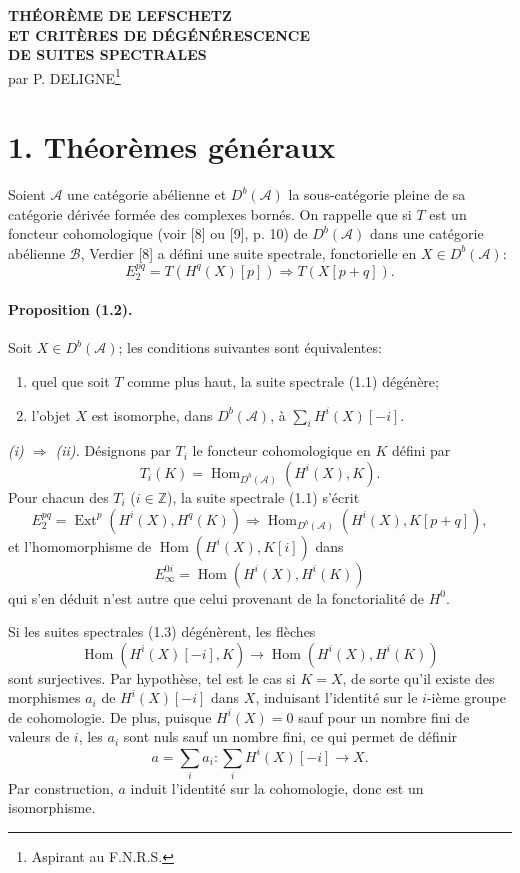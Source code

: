 \documentclass[10pt]{article}
\newcommand{\Acal}{\mathcal A}
\newcommand{\Bcal}{\mathcal B}
\newcommand{\Z}{\mathbb Z}
\newcommand{\Db}{D^b}
\newcommand{\Hom}{\operatorname{Hom}}
\newcommand{\Ext}{\operatorname{Ext}}
\begin{document}
\begin{center}
{\Large\bfseries THÉORÈME DE LEFSCHETZ\\
ET CRITÈRES DE DÉGÉNÉRESCENCE\\
DE SUITES SPECTRALES}\\[0.6em]
par P. DELIGNE\footnote{Aspirant au F.N.R.S.}
\end{center}

\section*{1. Théorèmes généraux}

Soient $\Acal$ une catégorie abélienne et $\Db(\Acal)$ la sous-catégorie pleine de sa catégorie dérivée formée des complexes bornés. On rappelle que si $T$ est un foncteur cohomologique (voir [8] ou [9], p. 10) de $\Db(\Acal)$ dans une catégorie abélienne $\Bcal$, Verdier [8] a défini une suite spectrale, fonctorielle en $X\in\Db(\Acal)$:
\[
\tag{1.1}
E_2^{pq}=T(H^q(X)[p])\Longrightarrow T(X[p+q]).
\]

\paragraph{Proposition (1.2).} Soit $X\in\Db(\Acal)$; les conditions suivantes sont équivalentes:
\begin{enumerate}[label=(\roman*)]
\item quel que soit $T$ comme plus haut, la suite spectrale (1.1) dégénère;
\item l'objet $X$ est isomorphe, dans $\Db(\Acal)$, à $\sum_i H^i(X)[-i]$.
\end{enumerate}

\emph{(i) $\Rightarrow$ (ii).} Désignons par $T_i$ le foncteur cohomologique en $K$ défini par
\[
T_i(K)=\Hom_{\Db(\Acal)}(H^i(X),K).
\]
Pour chacun des $T_i$ ($i\in\Z$), la suite spectrale (1.1) s'écrit
\[
\tag{1.3}
E_2^{pq}=\Ext^p(H^i(X),H^q(K))\Longrightarrow
\Hom_{\Db(\Acal)}(H^i(X),K[p+q]),
\]
et l'homomorphisme de $\Hom(H^i(X),K[i])$ dans
\[
E_\infty^{0i}=\Hom(H^i(X),H^i(K))
\]
qui s'en déduit n'est autre que celui provenant de la fonctorialité de $H^0$.

Si les suites spectrales (1.3) dégénèrent, les flèches
\[
\Hom(H^i(X)[-i],K)\longrightarrow \Hom(H^i(X),H^i(K))
\]
sont surjectives. Par hypothèse, tel est le cas si $K=X$, de sorte qu'il existe des morphismes $a_i$ de $H^i(X)[-i]$ dans $X$, induisant l'identité sur le $i$-ième groupe de cohomologie. De plus, puisque $H^i(X)=0$ sauf pour un nombre fini de valeurs de $i$, les $a_i$ sont nuls sauf un nombre fini, ce qui permet de définir
\[
a=\sum_i a_i:\sum_i H^i(X)[-i]\longrightarrow X.
\]
Par construction, $a$ induit l'identité sur la cohomologie, donc est un isomorphisme.
\end{document}
